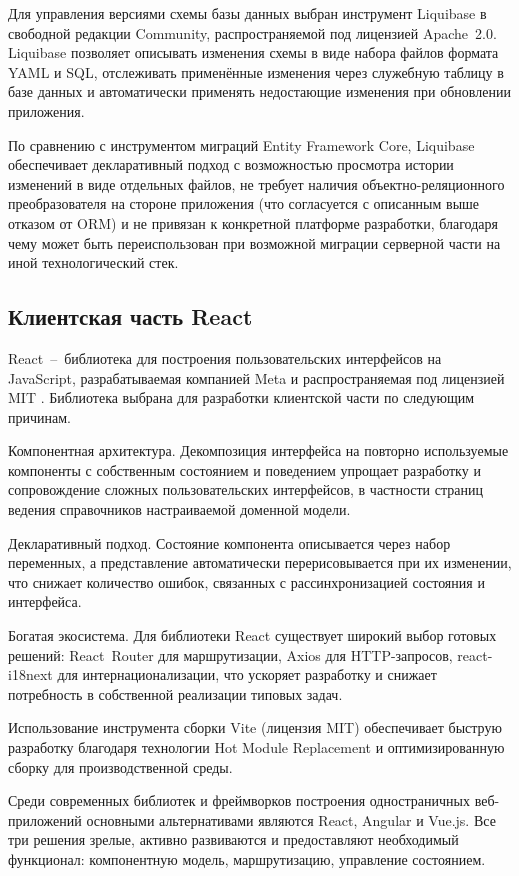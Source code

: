 Для управления версиями схемы базы данных выбран инструмент Liquibase  в свободной редакции Community, распространяемой под лицензией Apache~2.0.
Liquibase позволяет описывать изменения схемы в виде набора файлов формата YAML и SQL, отслеживать применённые изменения через служебную таблицу в базе данных и автоматически применять недостающие изменения при обновлении приложения.

По сравнению с инструментом миграций Entity Framework Core, Liquibase обеспечивает декларативный подход с возможностью просмотра истории изменений в виде отдельных файлов, не требует наличия объектно-реляционного преобразователя на стороне приложения (что согласуется с описанным выше отказом от ORM) и не привязан к конкретной платформе разработки, благодаря чему может быть переиспользован при возможной миграции серверной части на иной технологический стек.

\subsection{Клиентская часть React}

React~--~библиотека для построения пользовательских интерфейсов на JavaScript, разрабатываемая компанией Meta и распространяемая под лицензией MIT .
Библиотека выбрана для разработки клиентской части по следующим причинам.

Компонентная архитектура.
Декомпозиция интерфейса на повторно используемые компоненты с собственным состоянием и поведением упрощает разработку и сопровождение сложных пользовательских интерфейсов, в частности страниц ведения справочников настраиваемой доменной модели.

Декларативный подход.
Состояние компонента описывается через набор переменных, а представление автоматически перерисовывается при их изменении, что снижает количество ошибок, связанных с рассинхронизацией состояния и интерфейса.

Богатая экосистема.
Для библиотеки React существует широкий выбор готовых решений: React~Router для маршрутизации, Axios для HTTP-запросов, react-i18next для интернационализации, что ускоряет разработку и снижает потребность в собственной реализации типовых задач.

Использование инструмента сборки Vite  (лицензия MIT) обеспечивает быструю разработку благодаря технологии Hot Module Replacement и оптимизированную сборку для производственной среды.

Среди современных библиотек и фреймворков построения одностраничных веб-приложений основными альтернативами являются React, Angular и Vue.js.
Все три решения зрелые, активно развиваются и предоставляют необходимый функционал: компонентную модель, маршрутизацию, управление состоянием.

